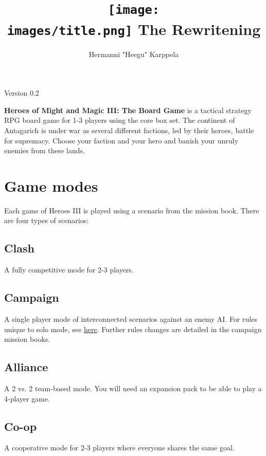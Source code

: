 \documentclass[12pt]{article}
\def\assets{assets}
\def\images{\assets/images}
\begin{document}
\title{\texttt{[image: \\images/title.png]} The Rewritening}

\author{Hermanni "Heegu" Karppela}
\maketitle



\begin{center}
Version 0.2
\end{center}

\tableofcontents

\clearpage

\textbf{Heroes of Might and Magic III: The Board Game} is a tactical strategy RPG board game for 1-3 players using the core box set. The continent of Antagarich is under war as several different factions, led by their heroes, battle for supremacy. Choose your faction and your hero and banish your unruly enemies from these lands.

\section{Game modes}
Each game of Heroes III is played using a scenario from the mission book. There are four types of scenarios:
\subsection*{Clash}

A fully competitive mode for 2-3 players.

\subsection*{Campaign}
A single player mode of interconnected scenarios against an enemy AI. For rules unique to solo mode, see \hyperlink{AIrules}{here}. Further rules changes are detailed in the campaign mission books.

\subsection*{Alliance}
A 2 vs. 2 team-based mode. You will need an expansion pack to be able to play a 4-player game.

\subsection*{Co-op}
A cooperative mode for 2-3 players where everyone shares the same goal.
\clearpage
\end{document}

